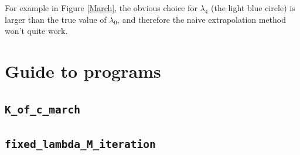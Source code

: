 \documentclass{article}
\begin{document}
For example in Figure \ref{March}, the obvious choice for $\lambda_4$
(the light blue circle) is larger than the true value of $\lambda_0$, 
and therefore the naive extrapolation method won't quite work.
\clearpage
\section*{Guide to programs}
\subsection*{\color{blue} \texttt{K\_of\_c\_march}}

\subsection*{\color{blue} \texttt{fixed\_lambda\_M\_iteration}}

\end{document}
